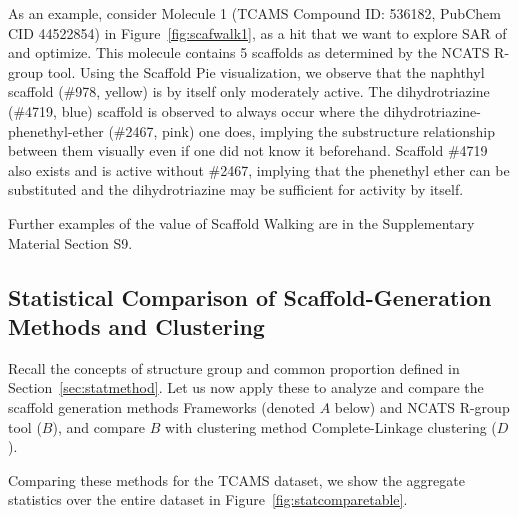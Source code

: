\documentclass[journal=jacsat,biochem,manuscript=article]{achemso}
\newcommand*\fref[1]{Figure~\ref{fig:#1}}
\newcommand*\sref[1]{Section~\ref{sec:#1}}
\begin{document}
As an example, consider Molecule 1 (TCAMS Compound ID: 536182, PubChem CID 44522854) in \fref{scafwalk1}, as a hit that we want to explore SAR of and optimize. This molecule contains 5 scaffolds as determined by the NCATS R-group tool. Using the Scaffold Pie visualization, we observe that the naphthyl scaffold (\#978, yellow) is by itself only moderately active.  The dihydrotriazine (\#4719, blue) scaffold is observed to always occur where the dihydrotriazine-phenethyl-ether (\#2467, pink) one does, implying the substructure relationship between them visually even if one did not know it beforehand. Scaffold \#4719 also exists and is active without \#2467, implying that the phenethyl ether can be substituted and the dihydrotriazine may be sufficient for activity by itself.

Further examples of the value of Scaffold Walking are in the Supplementary Material Section S9.

\subsection{Statistical Comparison of Scaffold-Generation Methods and Clustering}\label{sec:statcomp}

Recall the concepts of structure group and common proportion defined in \sref{statmethod}.  Let us now apply these to analyze and compare the scaffold generation methods Frameworks (denoted $A$ below) and NCATS R-group tool ($B$), and compare $B$ with clustering method Complete-Linkage clustering ($D$).

Comparing these methods for the TCAMS dataset, we show the aggregate statistics over the entire dataset in \fref{statcomparetable}.  
\end{document}
